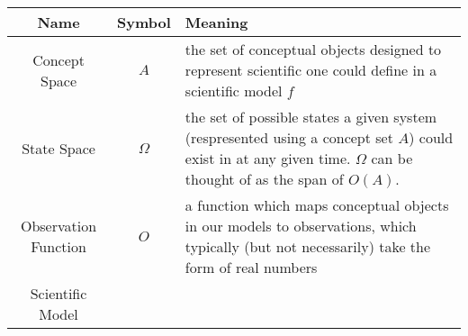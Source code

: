 \begin{longtable}[]{@{}ccl@{}}
\toprule
\begin{minipage}[b]{0.25\columnwidth}\centering
Name\strut
\end{minipage} & \begin{minipage}[b]{0.23\columnwidth}\centering
Symbol\strut
\end{minipage} & \begin{minipage}[b]{0.42\columnwidth}\raggedright
Meaning\strut
\end{minipage}\tabularnewline
\midrule
\endhead
\begin{minipage}[t]{0.25\columnwidth}\centering
Concept Space\strut
\end{minipage} & \begin{minipage}[t]{0.23\columnwidth}\centering
\(A\)\strut
\end{minipage} & \begin{minipage}[t]{0.42\columnwidth}\raggedright
the set of conceptual objects designed to represent scientific one could
define in a scientific model \(f\)\strut
\end{minipage}\tabularnewline
\begin{minipage}[t]{0.25\columnwidth}\centering
State Space\strut
\end{minipage} & \begin{minipage}[t]{0.23\columnwidth}\centering
\(\Omega\)\strut
\end{minipage} & \begin{minipage}[t]{0.42\columnwidth}\raggedright
the set of possible states a given system (respresented using a concept
set \(A\)) could exist in at any given time. \(\Omega\) can be thought
of as the span of \(O(A)\).\strut
\end{minipage}\tabularnewline
\begin{minipage}[t]{0.25\columnwidth}\centering
Observation Function\strut
\end{minipage} & \begin{minipage}[t]{0.23\columnwidth}\centering
\(O\)\strut
\end{minipage} & \begin{minipage}[t]{0.42\columnwidth}\raggedright
a function which maps conceptual objects in our models to observations,
which typically (but not necessarily) take the form of real
numbers\strut
\end{minipage}\tabularnewline
\begin{minipage}[t]{0.25\columnwidth}\centering
Scientific Model\strut
\end{minipage} & \begin{minipage}[t]{0.23\columnwidth}\centering

\end{minipage}
\end{longtable}
